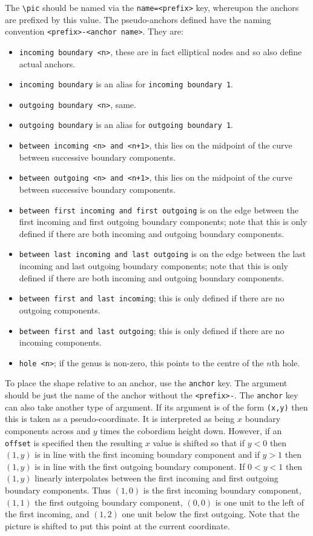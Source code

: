 \documentclass{ltxdoc}
\begin{document}
The \Verb+\pic+ should be named via the \Verb+name=<prefix>+ key, whereupon the anchors are prefixed by this value.
The pseudo-anchors defined have the naming convention \Verb+<prefix>-<anchor name>+.
They are:
%
\begin{itemize}
\item \Verb+incoming boundary <n>+, these are in fact elliptical nodes and so also define actual anchors.
\item \Verb+incoming boundary+ is an alias for \Verb+incoming boundary 1+.
\item \Verb+outgoing boundary <n>+, same.
\item \Verb+outgoing boundary+ is an alias for \Verb+outgoing boundary 1+.
\item \Verb=between incoming <n> and <n+1>=, this lies on the midpoint of the curve between successive boundary components.
\item \Verb=between outgoing <n> and <n+1>=, this lies on the midpoint of the curve between successive boundary components.
\item \Verb=between first incoming and first outgoing= is on the edge between the first incoming and first outgoing boundary components; note that this is only defined if there are both incoming and outgoing boundary components.
\item \Verb=between last incoming and last outgoing= is on the edge between the last incoming and last outgoing boundary components; note that this is only defined if there are both incoming and outgoing boundary components.
\item \Verb=between first and last incoming=; this is only defined if there are no outgoing components.
\item \Verb=between first and last outgoing=; this is only defined if there are no incoming components.
\item \Verb=hole <n>=; if the genus is non-zero, this points to the centre of the \(n\)th hole.
\end{itemize}

To place the shape relative to an anchor, use the \Verb+anchor+ key.
The argument should be just the name of the anchor without the \Verb+<prefix>-+.
The \Verb+anchor+ key can also take another type of argument.
If its argument is of the form \Verb+(x,y)+ then this is taken as a pseudo-coordinate.
It is interpreted as being \(x\) boundary components across and \(y\) times the cobordism height down.
However, if an \Verb+offset+ is specified then the resulting \(x\) value is shifted so that if \(y < 0\) then \((1,y)\) is in line with the first incoming boundary component and if \(y > 1\) then \((1,y)\) is in line with the first outgoing boundary component.
If \(0 < y < 1\) then \((1,y)\) linearly interpolates between the first incoming and first outgoing boundary components.
Thus \((1,0)\) is the first incoming boundary component, \((1,1)\) the first outgoing boundary component, \((0,0)\) is one unit to the left of the first incoming, and \((1,2)\) one unit below the first outgoing.
Note that the picture is shifted to put this point at the current coordinate.
\end{document}
